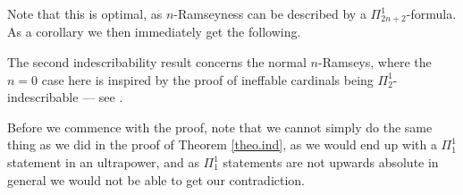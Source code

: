 \documentclass[../../main]{subfiles}
\begin{document}
Note that this is optimal, as $n$-Ramseyness can be described by a $\Pi^1_{2n+2}$-formula. As a corollary we then immediately get the following.


The second indescribability result concerns the normal $n$-Ramseys, where the $n=0$ case here is inspired by the proof of ineffable cardinals being $\Pi^1_2$-indescribable --- see \cite{Abramson}.


Before we commence with the proof, note that we cannot simply do the same thing as we did in the proof of Theorem \ref{theo.ind}, as we would end up with a $\Pi^1_1$ statement in an ultrapower, and as $\Pi^1_1$ statements are not upwards absolute in general we would not be able to get our contradiction.\\
\end{document}
